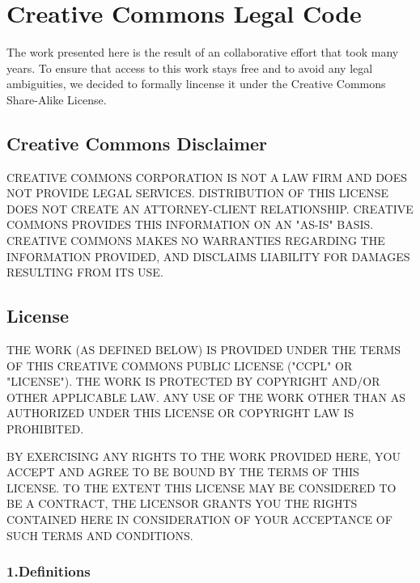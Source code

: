 \section{Creative Commons Legal Code}
\label{sec:cc}        

The work presented here is the result of an collaborative effort
that took many years.  To ensure that access to this work stays free
and to avoid any legal ambiguities, we decided to formally lincense
it under the Creative Commons Share-Alike License.

        \subsection*{Creative Commons Disclaimer}


          CREATIVE COMMONS CORPORATION IS NOT A LAW FIRM AND DOES
          NOT PROVIDE LEGAL SERVICES. DISTRIBUTION OF THIS LICENSE
          DOES NOT CREATE AN ATTORNEY-CLIENT RELATIONSHIP. CREATIVE
          COMMONS PROVIDES THIS INFORMATION ON AN "AS-IS" BASIS.
          CREATIVE COMMONS MAKES NO WARRANTIES REGARDING THE
          INFORMATION PROVIDED, AND DISCLAIMS LIABILITY FOR DAMAGES
          RESULTING FROM ITS USE.

        \subsection*{License}

        THE WORK (AS DEFINED BELOW) IS PROVIDED UNDER THE TERMS
        OF THIS CREATIVE COMMONS PUBLIC LICENSE ("CCPL" OR
        "LICENSE"). THE WORK IS PROTECTED BY COPYRIGHT AND/OR OTHER
        APPLICABLE LAW. ANY USE OF THE WORK OTHER THAN AS
        AUTHORIZED UNDER THIS LICENSE OR COPYRIGHT LAW IS
        PROHIBITED.

        BY EXERCISING ANY RIGHTS TO THE WORK PROVIDED HERE, YOU
        ACCEPT AND AGREE TO BE BOUND BY THE TERMS OF THIS LICENSE.
        TO THE EXTENT THIS LICENSE MAY BE CONSIDERED TO BE A
        CONTRACT, THE LICENSOR GRANTS YOU THE RIGHTS CONTAINED HERE
        IN CONSIDERATION OF YOUR ACCEPTANCE OF SUCH TERMS AND
        CONDITIONS.

        \subsubsection{1.Definitions}

